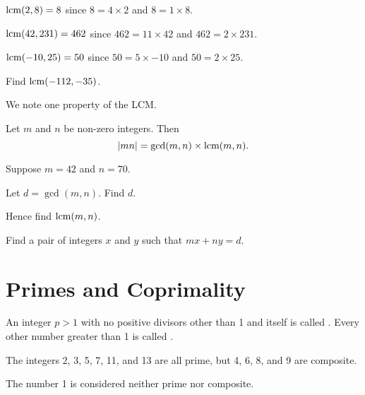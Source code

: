 \begin{example}
    $\mathrm{lcm}(2, 8) = 8$ since $8 = 4 \times 2$ and $8 = 1 \times 8$.
\end{example}
\begin{example}
    $\mathrm{lcm}(42, 231) = 462$ since $462 = 11 \times 42$ and $462 = 2 \times 231$.
\end{example}
\begin{example}
    $\mathrm{lcm}(-10, 25) = 50$ since $50 = 5 \times -10$ and $50 = 2 \times 25$.
\end{example}
\begin{exercise}
    Find $\mathrm{lcm}(-112, -35)$.
\end{exercise}

We note one property of the LCM.
\begin{proposition}\label{prop-product-of-gcd-and-lcm}
    Let $m$ and $n$ be non-zero integers. Then
    \[
        |mn| = \gcd(m,n) \times \mathrm{lcm}(m,n).
    \]
\end{proposition}

\begin{exercise}
    Suppose $m = 42$ and $n = 70$.
    \begin{partquestions}{\roman*}
        \item Let $d = \gcd(m,n)$. Find $d$.
        \item Hence find $\mathrm{lcm}(m,n)$.
        \item Find a pair of integers $x$ and $y$ such that $mx + ny = d$.
    \end{partquestions}
\end{exercise}

\section{Primes and Coprimality}
\begin{definition}\label{definition-prime-number}
    An integer $p > 1$ with no positive divisors other than 1 and itself is called . Every other number greater than 1 is called .
\end{definition}
\begin{example}
    The integers 2, 3, 5, 7, 11, and 13 are all prime, but 4, 6, 8, and 9 are composite.
\end{example}
\begin{remark}
    The number 1 is considered neither prime nor composite.
\end{remark}

